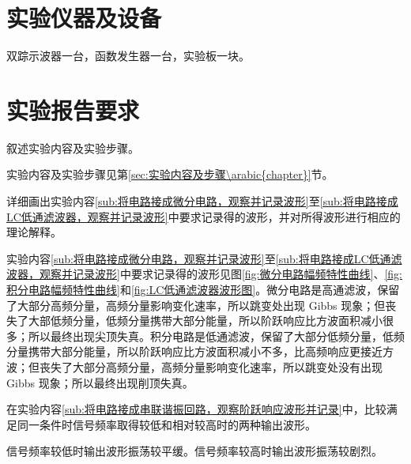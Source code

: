 \section{实验仪器及设备}%
\label{sec:实验仪器及设备\arabic{chapter}}

双踪示波器一台，函数发生器一台，实验板一块。

\section{实验报告要求}%
\label{sec:实验报告要求\arabic{chapter}}

\begin{Exercise}
	叙述实验内容及实验步骤。
\end{Exercise}

\begin{Answer}
	实验内容及实验步骤见第\ref{sec:实验内容及步骤\arabic{chapter}}节。
\end{Answer}

\begin{Exercise}
	详细画出实验内容\ref{sub:将电路接成微分电路，观察并记录波形}至\ref{sub:将电路接成LC低通滤波器，观察并记录波形}中要求记录得的波形，并对所得波形进行相应的理论解释。
\end{Exercise}

\begin{Answer}
	实验内容\ref{sub:将电路接成微分电路，观察并记录波形}至\ref{sub:将电路接成LC低通滤波器，观察并记录波形}中要求记录得的波形见图\ref{fig:微分电路幅频特性曲线}、\ref{fig:积分电路幅频特性曲线}和\ref{fig:LC低通滤波器波形图}。微分电路是高通滤波，保留了大部分高频分量，高频分量影响变化速率，所以跳变处出现 Gibbs 现象；但丧失了大部低频分量，低频分量携带大部分能量，所以阶跃响应比方波面积减小很多；所以最终出现尖顶失真。积分电路是低通滤波，保留了大部分低频分量，低频分量携带大部分能量，所以阶跃响应比方波面积减小不多，比高频响应更接近方波；但丧失了大部分高频分量，高频分量影响变化速率，所以跳变处没有出现 Gibbs 现象；所以最终出现削顶失真。
\end{Answer}

\begin{Exercise}
	在实验内容\ref{sub:将电路接成串联谐振回路，观察阶跃响应波形并记录}中，比较满足同一条件时信号频率取得较低和相对较高时的两种输出波形。
\end{Exercise}

\begin{Answer}
	信号频率较低时输出波形振荡较平缓。信号频率较高时输出波形振荡较剧烈。
\end{Answer}

